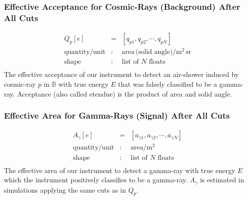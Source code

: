 \documentclass{article}%
\begin{document}
            \subsubsection*{Effective Acceptance for Cosmic-Rays (Background) After All Cuts}
                \begin{eqnarray*}
                    Q_p[e] &=& [q_{p1}, q_{p2}, \cdots, q_{pN}]\\
                    \text{quantity}/\text{unit} &:& \text{area} \, \text{(solid angle)} / \text{m}^{2}\,\text{sr}\\
                    \text{shape} &:& \text{list of}\,\,N\,\,\text{floats}\\
                \end{eqnarray*}
                The effective acceptance of our instrument to detect an air-shower induced by cosmic-ray $p$ in $\mathbb{B}$ with true energy $E$ that was falsely classified to be a gamma-ray.
                Acceptance (also called etendue) is the product of area and solid angle.
            \subsubsection*{Effective Area for Gamma-Rays (Signal) After All Cuts}
                \begin{eqnarray*}
                    A_\gamma[e] &=& [a_{\gamma 1}, a_{\gamma 2}, \cdots, a_{\gamma N}]\\
                    \text{quantity}/\text{unit} &:& \text{area} / \text{m}^{2}\\
                    \text{shape} &:& \text{list of}\,\,N\,\,\text{floats}\\
                \end{eqnarray*}
                The effective area of our instrument to detect a gamma-ray with true energy $E$ which the instrument positively classifies to be a gamma-ray.
                $A_\gamma$ is estimated in simulations applying the same cuts as in $Q_p$.
\end{document}
